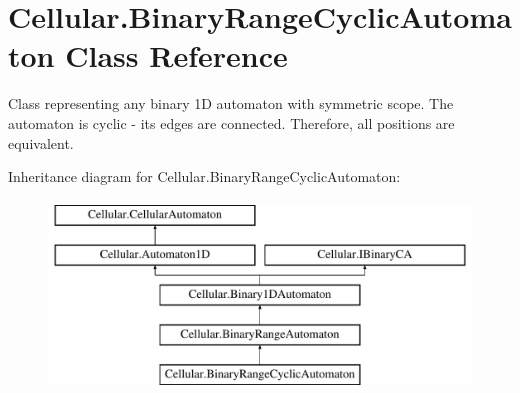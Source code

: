 \hypertarget{class_cellular_1_1_binary_range_cyclic_automaton}{}\section{Cellular.\+Binary\+Range\+Cyclic\+Automaton Class Reference}
\label{class_cellular_1_1_binary_range_cyclic_automaton}


Class representing any binary 1\+D automaton with symmetric scope. The automaton is cyclic -\/ its edges are connected. Therefore, all positions are equivalent.  


Inheritance diagram for Cellular.\+Binary\+Range\+Cyclic\+Automaton\+:\begin{figure}[H]
\begin{center}
\leavevmode
\includegraphics[height=5.000000cm]{class_cellular_1_1_binary_range_cyclic_automaton}
\end{center}
\end{figure}
